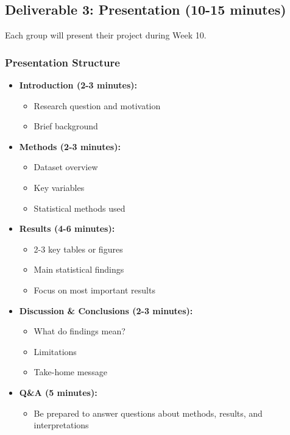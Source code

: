 \documentclass[11pt]{article}
\begin{document}
\subsection{Deliverable 3: Presentation (10-15 minutes)}

Each group will present their project during Week 10.

\subsubsection{Presentation Structure}

\begin{itemize}
\item \textbf{Introduction (2-3 minutes):}
  \begin{itemize}
  \item Research question and motivation
  \item Brief background
  \end{itemize}

\item \textbf{Methods (2-3 minutes):}
  \begin{itemize}
  \item Dataset overview
  \item Key variables
  \item Statistical methods used
  \end{itemize}

\item \textbf{Results (4-6 minutes):}
  \begin{itemize}
  \item 2-3 key tables or figures
  \item Main statistical findings
  \item Focus on most important results
  \end{itemize}

\item \textbf{Discussion \& Conclusions (2-3 minutes):}
  \begin{itemize}
  \item What do findings mean?
  \item Limitations
  \item Take-home message
  \end{itemize}

\item \textbf{Q\&A (5 minutes):}
  \begin{itemize}
  \item Be prepared to answer questions about methods, results, and interpretations
  \end{itemize}
\end{itemize}
\end{document}
